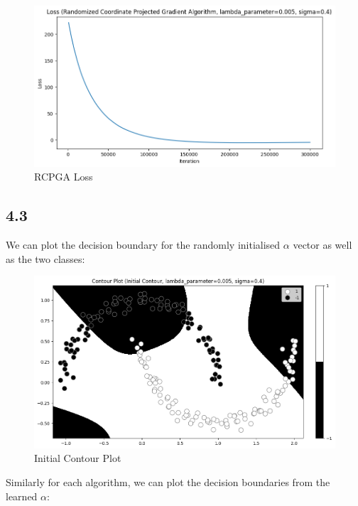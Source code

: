 \documentclass[12pt]{article}
\begin{document}
\begin{figure}[h]
\centering
\includegraphics[scale=0.3]{outputs/part_4/rcpga-loss}
\caption{RCPGA Loss}
\label{fig:}
\end{figure}
\newpage

\subsection*{4.3}

We can plot the decision boundary for the randomly initialised $\alpha$ vector as well as the two classes:

\begin{figure}[h]
\centering
\includegraphics[scale=0.35]{outputs/part_4/initial-contour}
\caption{Initial Contour Plot}
\label{fig:}
\end{figure}

Similarly for each algorithm, we can plot the decision boundaries from the learned $\alpha$:
\end{document}
